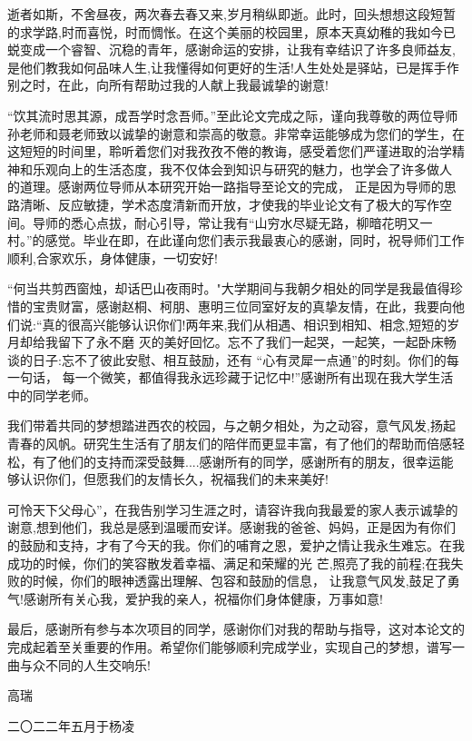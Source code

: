 \begin{acknowledgement}

逝者如斯，不舍昼夜，两次春去春又来,岁月稍纵即逝。此时，回头想想这段短暂的求学路,时而喜悦，时而惆怅。在这个美丽的校园里，原本天真幼稚的我如今已蜕变成一个睿智、沉稳的青年，感谢命运的安排，让我有幸结识了许多良师益友,是他们教我如何品味人生,让我懂得如何更好的生活!人生处处是驿站，已是挥手作别之时，在此，向所有帮助过我的人献上我最诚挚的谢意!

“饮其流时思其源，成吾学时念吾师。”至此论文完成之际，谨向我尊敬的两位导师孙老师和聂老师致以诚挚的谢意和崇高的敬意。非常幸运能够成为您们的学生，在这短短的时间里，聆听着您们对我孜孜不倦的教诲，感受着您们严谨进取的治学精神和乐观向上的生活态度，我不仅体会到知识与研究的魅力，也学会了许多做人 的道理。感谢两位导师从本研究开始一路指导至论文的完成， 正是因为导师的思路清晰、反应敏捷，学术态度清新而开放，才使我的毕业论文有了极大的写作空间。导师的悉心点拔，耐心引导，常让我有“山穷水尽疑无路，柳暗花明又一村。”的感觉。毕业在即，在此谨向您们表示我最衷心的感谢，同时，祝导师们工作顺利,合家欢乐，身体健康，一切安好!



“何当共剪西窗烛，却话巴山夜雨时。"大学期间与我朝夕相处的同学是我最值得珍惜的宝贵财富，感谢赵桐、柯朋、惠明三位同室好友的真挚友情，在此，我要向他们说:“真的很高兴能够认识你们!两年来,我们从相遇、相识到相知、相念,短短的岁月却给我留下了永不磨 灭的美好回忆。忘不了我们一起哭，一起笑，一起卧床畅谈的日子:忘不了彼此安慰、相互鼓励，还有 “心有灵犀一点通”的时刻。你们的每一句话， 每一个微笑，都值得我永远珍藏于记忆中!”感谢所有出现在我大学生活中的同学老师。

我们带着共同的梦想踏进西农的校园，与之朝夕相处，为之动容，意气风发,扬起青春的风帆。研究生生活有了朋友们的陪伴而更显丰富，有了他们的帮助而倍感轻松，有了他们的支持而深受鼓舞....感谢所有的同学，感谢所有的朋友，很幸运能够认识你们，但愿我们的友情长久，祝福我们的未来美好!

可怜天下父母心”，在我告别学习生涯之时，请容许我向我最爱的家人表示诚挚的谢意,想到他们，我总是感到温暖而安详。感谢我的爸爸、妈妈，正是因为有你们的鼓励和支持，才有了今天的我。你们的哺育之恩，爱护之情让我永生难忘。在我成功的时候，你们的笑容散发着幸福、满足和荣耀的光 芒,照亮了我的前程;在我失败的时候，你们的眼神透露出理解、包容和鼓励的信息， 让我意气风发,鼓足了勇气!感谢所有关心我，爱护我的亲人，祝福你们身体健康，万事如意!

最后，感谢所有参与本次项目的同学，感谢你们对我的帮助与指导，这对本论文的完成起着至关重要的作用。希望你们能够顺利完成学业，实现自己的梦想，谱写一曲与众不同的人生交响乐!

\begin{flushright}
         高瑞

二〇二二年五月于\quad 杨凌
\end{flushright}






\end{acknowledgement}
